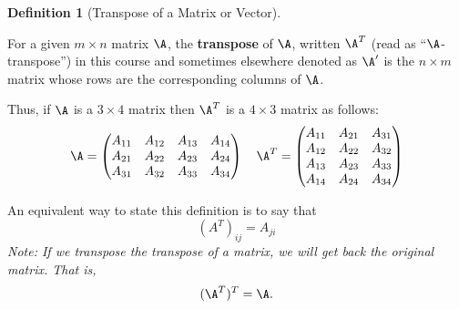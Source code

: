 \documentclass[
]{article}
\theoremstyle{definition}
\newtheorem{definition}{Definition}[section]
\theoremstyle{definition}
\theoremstyle{definition}
\theoremstyle{definition}
\theoremstyle{remark}
\begin{document}
\begin{definition}[Transpose of a Matrix or Vector]
\protect\hypertarget{def:transposedef}{}\label{def:transposedef}

For a given \(m\times n\) matrix \(\A\), the \textbf{transpose} of \(\A\), written \(\A^T\) (read as ``\(\A\)-transpose'') in this course and sometimes elsewhere denoted as \(\A'\) is the \(n\times m\) matrix whose rows are the corresponding columns of \(\A\).

Thus, if \(\A\) is a \(3\times 4\) matrix then \(\A^T\) is a \(4\times 3\) matrix as follows:
\[\A = \left(\begin{matrix} A_{11} & A_{12} & A_{13} &A_{14}\\ A_{21} & A_{22} & A_{23} &A_{24}\\ A_{31} & A_{32} & A_{33} &A_{34}\end{matrix}\right)
\quad  \A^T = \left(\begin{matrix} A_{11} & A_{21} & A_{31}\\A_{12} & A_{22} & A_{32}\\A_{13} & A_{23} & A_{33}\\A_{14} & A_{24} & A_{34}\end{matrix}\right)\]

An equivalent way to state this definition is to say that
\[(A^T)_{ij} = A_{ji}\]
\emph{Note: If we transpose the transpose of a matrix, we will get back the original matrix. That is,} \[(\A^T)^T = \A.\]

\end{definition}
\end{document}
